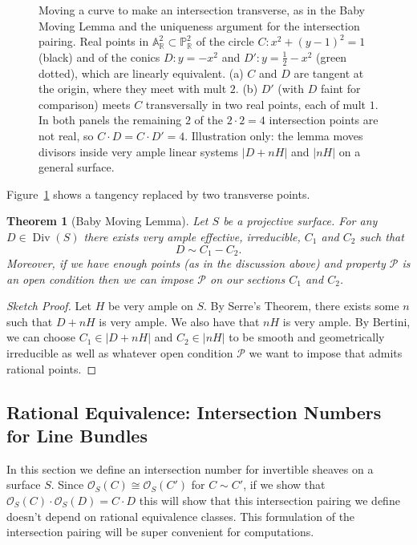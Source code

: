 \documentclass[12pt]{article}
\numberwithin{equation}{section}
\newtheorem{theorem}{Theorem}[subsection]
\theoremstyle{definition}
\theoremstyle{remark}
\newcommand{\RR}{\mathbb{R}}
\newcommand{\Ocal}{\mathcal{O}}
\newcommand{\PP}{\mathbb{P}}
\renewcommand{\AA}{\mathbb{A}}
\newcommand{\Div}{\operatorname{Div}}
\newcommand{\Pcal}{\mathcal{P}}
\begin{document}
\begin{figure}[H]
\centering

\caption{Moving a curve to make an intersection transverse, as in the Baby Moving Lemma and the uniqueness argument for the intersection pairing. Real points in $\AA^2_\RR\subset\PP^2_\RR$ of the circle $C\colon x^2+(y-1)^2=1$ (black) and of the conics $D\colon y=-x^2$ and $D'\colon y=\tfrac12-x^2$ (green dotted), which are linearly equivalent. (a) $C$ and $D$ are tangent at the origin, where they meet with mult $2$. (b) $D'$ (with $D$ faint for comparison) meets $C$ transversally in two real points, each of mult $1$. In both panels the remaining $2$ of the $2\cdot2=4$ intersection points are not real, so $C\cdot D=C\cdot D'=4$. Illustration only: the lemma moves divisors inside very ample linear systems $\vert D+nH\vert$ and $\vert nH\vert$ on a general surface.}\label{fig:moving-transverse}
\end{figure}
Figure~\ref{fig:moving-transverse} shows a tangency replaced by two transverse points.

\begin{theorem}[Baby Moving Lemma]
	Let $S$ be a projective surface.
	For any $D\in \Div(S)$ there exists very ample effective, irreducible, $C_1$ and $C_2$ such that 
	 $$ D \sim C_1 - C_2. $$
	Moreover, if we have enough points (as in the discussion above) and property $\Pcal$ is an open condition then we can impose $\Pcal$ on our sections $C_1$ and $C_2$.
\end{theorem}
\begin{proof}[Sketch Proof]
	Let $H$ be very ample on $S$. 
	By Serre's Theorem, there exists some $n$ such that $D+nH$ is very ample. 
	We also have that $nH$ is very ample. 
	By Bertini, we can choose $C_1 \in \vert D+n H\vert$ and $C_2 \in \vert n H \vert$ to be smooth and geometrically irreducible as well as whatever open condition $\Pcal$ we want to impose that admits rational points.
\end{proof}

\subsection{Rational Equivalence: Intersection Numbers for Line Bundles}
In this section we define an intersection number for invertible sheaves on a surface $S$. 
Since $\Ocal_S(C)\cong \Ocal_S(C')$ for $C\sim C'$, if we show that $\Ocal_S(C)\cdot \Ocal_S(D) = C\cdot D$ this will show that this intersection pairing we define doesn't depend on rational equivalence classes. 
This formulation of the intersection pairing will be super convenient for computations. 
\end{document}
